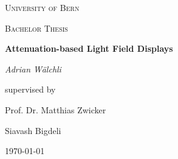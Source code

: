 \begin{titlepage}
	\centering
	
	{\scshape\LARGE University of Bern \par}
	
	\vspace{1cm}
	{\scshape\Large Bachelor Thesis \par}
	
	\vspace{1.5cm}
	{\huge\bfseries Attenuation-based Light Field Displays \par}
	
	\vspace{2cm}
	{\Large\itshape Adrian Wälchli \par}
	
	\vfill
	supervised by \par
	Prof. Dr. Matthias Zwicker \par
	Siavash Bigdeli
	
	\vfill
	{\large \today \par}
	
\end{titlepage}